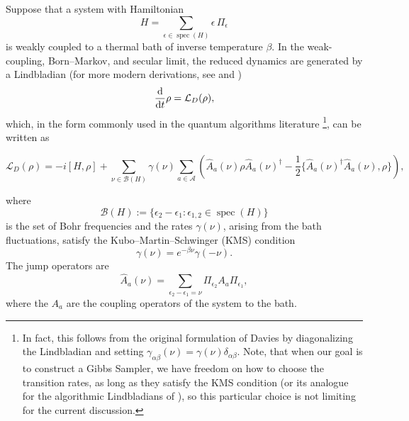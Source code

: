 \documentclass[showpacs,amsmath,amssymb,twocolumn,prx,superscriptaddress,10pt,aps,nofootinbib]{revtex4-2}
\begin{document}
Suppose that a system with Hamiltonian
\begin{equation}
    H=\sum_{\epsilon\in\operatorname{spec}(H)} \epsilon\,\Pi_\epsilon
\end{equation}
is weakly coupled to a thermal bath of inverse temperature $\beta$. In the weak-coupling, Born--Markov, and secular limit, the reduced dynamics are generated by a Lindbladian \cite{davies1974markovian,davies1976markovian} (for more modern derivations, see \cite[Sec.~XV]{lidar2019lecture} and \cite[Ch.~3.3]{breuer2002theory})
\begin{equation}
\label{eq:Lindblad_evolution}
    \dv{t}\rho=\mathcal{L}_D(\rho),
\end{equation}
which, in the form commonly used in the quantum algorithms literature \footnote{In fact, this follows from the original formulation of Davies by diagonalizing the Lindbladian and setting $\gamma_{\alpha \beta}(\nu)=\gamma (\nu)\delta_{\alpha \beta}$. Note, that when our goal is to construct a Gibbs Sampler, we have freedom on how to choose the transition rates, as long as they satisfy the KMS condition (or its analogue for the algorithmic Lindbladians of \cite{Chen2023b}), so this particular choice is not limiting for the current discussion.}, can be written as
\begin{widetext}
\begin{equation}
\label{eq:Davies_generator_conventional}
    \mathcal{L}_D(\rho)
    =
    -i[H,\rho]
    +
    \sum_{\nu\in\mathcal{B}(H)} \gamma(\nu)\sum_{a\in\mathcal{A}}
    \left(
    \hat A_a(\nu)\rho \hat A_a(\nu)^\dagger
    -\frac{1}{2}\{\hat A_a(\nu)^\dagger \hat A_a(\nu),\rho\}
    \right),
\end{equation}
\end{widetext}
where
\[
\mathcal{B}(H):=\{\epsilon_2-\epsilon_1:\epsilon_{1,2}\in\operatorname{spec}(H)\}
\]
is the set of Bohr frequencies and the rates $\gamma(\nu)$, arising from the bath fluctuations, satisfy the Kubo--Martin--Schwinger (KMS) condition
\begin{equation}
\label{eq:KMS_condition_first_davies}
    \gamma(\nu)=e^{-\beta\nu}\gamma(-\nu).
\end{equation}
The jump operators are
\begin{equation}
\label{eq:Jumps_of_Davies}
    \hat A_a(\nu)
    =
    \sum_{\epsilon_2-\epsilon_1=\nu}
    \Pi_{\epsilon_2}A_a\Pi_{\epsilon_1},
\end{equation}
where the $A_a$ are the coupling operators of the system to the bath.
\end{document}
